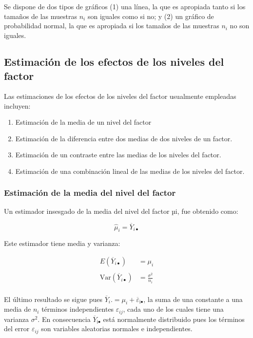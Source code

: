 \documentclass[]{book}
\theoremstyle{definition}
\theoremstyle{definition}
\theoremstyle{definition}
\theoremstyle{remark}
\begin{document}
Se dispone de dos tipos de gráficos (1) una línea, la que es apropiada
tanto si los tamaños de las muestras \(n_{i}\) son iguales como si no; y
(2) un gráfico de probabilidad normal, la que es apropiada si los
tamaños de las muestras \(n_{i}\) no son iguales.

\hypertarget{estimacion-de-los-efectos-de-los-niveles-del-factor}{%
\subsection{Estimación de los efectos de los niveles del
factor}\label{estimacion-de-los-efectos-de-los-niveles-del-factor}}

Las estimaciones de los efectos de los niveles del factor usualmente
empleadas incluyen:

\begin{enumerate}
\def\labelenumi{\arabic{enumi}.}
\item
  Estimación de la media de un nivel del factor
\item
  Estimación de la diferencia entre dos medias de dos niveles de un
  factor.
\item
  Estimación de un contraste entre las medias de los niveles del factor.
\item
  Estimación de una combinación lineal de las medias de los niveles del
  factor.
\end{enumerate}

\hypertarget{estimacion-de-la-media-del-nivel-del-factor}{%
\subsubsection{Estimación de la media del nivel del
factor}\label{estimacion-de-la-media-del-nivel-del-factor}}

Un estimador insesgado de la media del nivel del factor µi, fue obtenido
como:

\[
{\hat{\mu}}_{i} = {\overline{Y}}_{i\bullet}
\]

Este estimador tiene media y varianza:

\[
\begin{aligned}
E\left( {\overline{Y}}_{i\bullet} \right) &= \mu_{i} \\
 \\
\text{Var}\left( {\overline{Y}}_{i\bullet} \right) &= \frac{\sigma^{2}}{n_{i}} \\
\end{aligned}
\]

El último resultado se sigue pues
\({\overline{Y}}_{i}. = \mu_{i} + {\overline{\varepsilon}}_{\text{i}\bullet}\),
la suma de una constante a una media de \(n_{i}\) términos
independientes \(\varepsilon_{ij}\), cada uno de los cuales tiene una
varianza \(\sigma^{2}\). En consecuencia
\({\overline{Y}} _{\text{i}\bullet}\) está normalmente distribuido pues
los términos del error \(\varepsilon_{ij}\) son variables aleatorias
normales e independientes.
\end{document}
